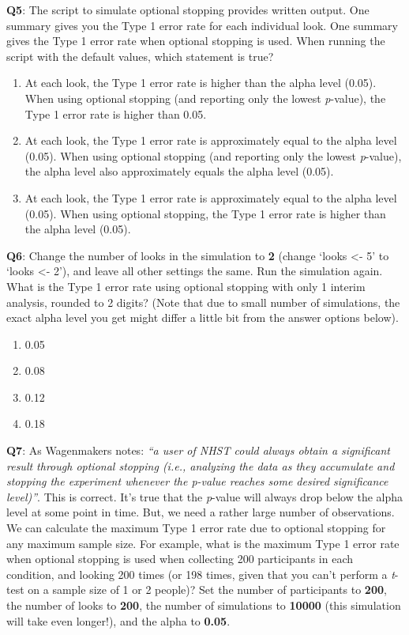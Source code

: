 \documentclass[
  oneside]{book}
\providecommand{\tightlist}{%
  \setlength{\itemsep}{0pt}\setlength{\parskip}{0pt}}
\begin{document}
\textbf{Q5}: The script to simulate optional stopping provides written output. One summary gives you the Type 1 error rate for each individual look. One summary gives the Type 1 error rate when optional stopping is used. When running the script with the default values, which statement is true?

\begin{enumerate}
\def\labelenumi{\Alph{enumi})}
\tightlist
\item
  At each look, the Type 1 error rate is higher than the alpha level (0.05).
  When using optional stopping (and reporting only the lowest \emph{p}-value), the Type 1 error rate is higher than 0.05.
\item
  At each look, the Type 1 error rate is approximately equal to the alpha level (0.05). When using optional stopping (and reporting only the lowest \emph{p}-value), the alpha level also approximately equals the alpha level (0.05).
\item
  At each look, the Type 1 error rate is approximately equal to the alpha level (0.05). When using optional stopping, the Type 1 error rate is higher than the alpha level (0.05).
\end{enumerate}

\textbf{Q6}: Change the number of looks in the simulation to \textbf{2} (change `looks \textless- 5' to `looks \textless- 2'), and leave all other settings the same. Run the simulation again. What is the Type 1 error rate using optional stopping with only 1 interim analysis, rounded to 2 digits? (Note that due to small number of simulations, the exact alpha level you get might differ a little bit from the
answer options below).

\begin{enumerate}
\def\labelenumi{\Alph{enumi})}
\tightlist
\item
  0.05
\item
  0.08
\item
  0.12
\item
  0.18
\end{enumerate}

\textbf{Q7}: As Wagenmakers \citeyearpar{wagenmakers_practical_2007} notes: \emph{``a user of NHST could always obtain a significant result through optional stopping (i.e., analyzing the data as they accumulate and stopping the experiment whenever the p-value reaches some desired significance level)''}. This is correct. It's true that the \emph{p}-value will always drop below the alpha level at some point in time. But, we need a rather large number of observations. We can calculate the maximum Type 1 error rate due to optional stopping for any maximum sample size. For example, what is the maximum Type 1 error rate when optional stopping is used when collecting 200 participants in each condition, and looking 200 times (or 198 times, given that you can't perform a \emph{t}-test on a sample size of 1 or 2 people)? Set the number of participants to \textbf{200}, the number of looks to \textbf{200}, the number of simulations to \textbf{10000} (this simulation will take even longer!), and the alpha to \textbf{0.05}.
\end{document}
